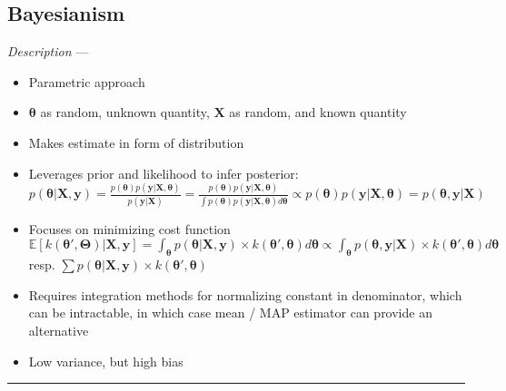 \subsection*{Bayesianism}
\emph{Description} --- 
\begin{itemize}
    \item Parametric approach
    \item $\boldsymbol{\theta}$ as random, unknown quantity, $\boldsymbol{X}$ as random, and known quantity
    \item Makes estimate in form of distribution
    \item Leverages prior and likelihood to infer posterior: $p(\boldsymbol{\theta}|\boldsymbol{X}, \boldsymbol{y}) = \frac{p(\boldsymbol{\theta})p(\boldsymbol{y}|\boldsymbol{X}, \boldsymbol{\theta})}{p(\boldsymbol{y}|\boldsymbol{X})} = \frac{p(\boldsymbol{\theta})p(\boldsymbol{y}|\boldsymbol{X}, \boldsymbol{\theta})}{\int p(\boldsymbol{\theta}) p(\boldsymbol{y}|\boldsymbol{X}, \boldsymbol{\theta}) d\boldsymbol{\theta}} \propto p(\boldsymbol{\theta})p(\boldsymbol{y}|\boldsymbol{X}, \boldsymbol{\theta}) = p(\boldsymbol{\theta}, \boldsymbol{y} |\boldsymbol{X})$ 
    \item Focuses on minimizing cost function $\mathbb{E}[k(\boldsymbol{\theta}',\boldsymbol{\Theta}) | \boldsymbol{X}, \boldsymbol{y}] = \int_{\boldsymbol{\theta}} p(\boldsymbol{\theta} | \boldsymbol{X}, \boldsymbol{y}) \times k(\boldsymbol{\theta}',\boldsymbol{\theta}) d\boldsymbol{\theta} \propto \int_{\boldsymbol{\theta}} p(\boldsymbol{\theta}, \boldsymbol{y} | \boldsymbol{X}) \times k(\boldsymbol{\theta}',\boldsymbol{\theta}) d\boldsymbol{\theta}$ resp. $\sum p(\boldsymbol{\theta} | \boldsymbol{X}, \boldsymbol{y}) \times k(\boldsymbol{\theta}',\boldsymbol{\theta})$
    \item Requires integration methods for normalizing constant in denominator, which can be intractable, in which case mean / MAP estimator can provide an alternative
    \item Low variance, but high bias 
\end{itemize}

{\color{lightgray}\hrule height 0.001mm}

